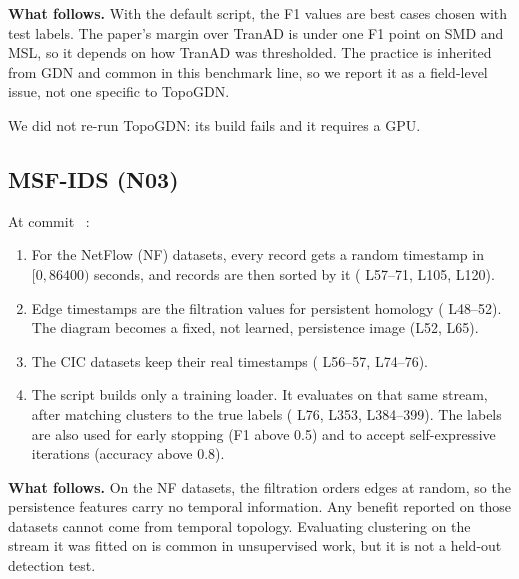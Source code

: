 \textbf{What follows.} With the default script, the F1 values are best cases chosen with test labels. The paper's margin over TranAD is under one F1 point on SMD and MSL, so it depends on how TranAD was thresholded. The practice is inherited from GDN and common in this benchmark line, so we report it as a field-level issue, not one specific to TopoGDN.

We did not re-run TopoGDN: its build fails and it requires a GPU. 

\subsection{MSF-IDS (N03)}
At commit ~\cite{N03}:
\begin{enumerate}
  \item For the NetFlow (NF) datasets, every record gets a random timestamp in $[0, 86400)$ seconds, and records are then sorted by it ( L57--71, L105, L120).
  \item Edge timestamps are the filtration values for persistent homology ( L48--52). The diagram becomes a fixed, not learned, persistence image (L52, L65).
  \item The CIC datasets keep their real timestamps ( L56--57, L74--76).
  \item The script builds only a training loader. It evaluates on that same stream, after matching clusters to the true labels ( L76, L353, L384--399). The labels are also used for early stopping (F1 above 0.5) and to accept self-expressive iterations (accuracy above 0.8). 
\end{enumerate}
\textbf{What follows.} On the NF datasets, the filtration orders edges at random, so the persistence features carry no temporal information. Any benefit reported on those datasets cannot come from temporal topology. Evaluating clustering on the stream it was fitted on is common in unsupervised work, but it is not a held-out detection test.

